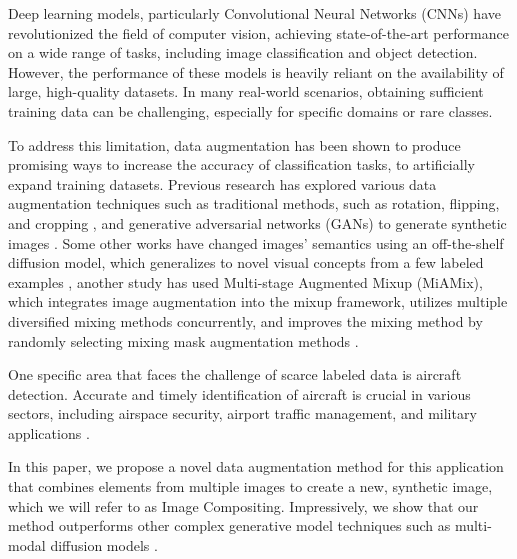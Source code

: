 Deep learning models, particularly Convolutional Neural Networks (CNNs) have revolutionized the field of computer vision, achieving state-of-the-art performance on a wide range of tasks, including image classification and object detection. However, the performance of these models is heavily reliant on the availability of large, high-quality datasets. In many real-world scenarios, obtaining sufficient training data can be challenging, especially for specific domains or rare classes.

To address this limitation, data augmentation has been shown to produce promising ways to increase the accuracy of classification tasks, to artificially expand training datasets. Previous research has explored various data augmentation techniques such as traditional methods, such as rotation, flipping, and cropping \cite{perez2017effectivenessdataaugmentationimage}, and generative adversarial networks (GANs) to generate synthetic images \cite{8388338}. Some other works have changed images' semantics using an off-the-shelf diffusion model, which generalizes to novel visual concepts from a few labeled examples \cite{trabucco2023effectivedataaugmentationdiffusion}, another study has used Multi-stage Augmented Mixup (MiAMix), which integrates image augmentation into the mixup framework, utilizes multiple diversified mixing methods concurrently, and improves the mixing method by randomly selecting mixing mask augmentation methods \cite{pr11123284}.

One specific area that faces the challenge of scarce labeled data is aircraft detection. Accurate and timely identification of aircraft is crucial in various sectors, including airspace security, airport traffic management, and military applications \cite{Arwin:09}. 

In this paper, we propose a novel data augmentation method for this application that combines elements from multiple images to create a new, synthetic image, which we will refer to as Image Compositing. Impressively, we show that our method outperforms other complex generative model techniques such as multi-modal diffusion models \cite{sd}. 